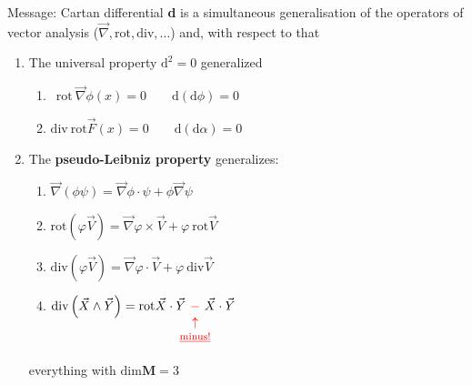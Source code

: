 \documentclass[../main.tex]{subfiles}
\begin{document}
{\selectfont{}\relax} Message: Cartan differential \textbf{d} is a simultaneous generalisation of the operators of vector analysis ($\vec{\nabla}, \textrm{rot}, \textrm{div}, \dots$) and, with respect to that
\begin{enumerate}
    \item The universal property $\textrm{d}^2=0$ generalized
    \begin{enumerate}
        \item \(\ \ \textrm{rot}\ \vec{\nabla}\phi(x)=0 \qquad \textrm{d}\left(\textrm{d}\phi\right)=0\)
        \item \(\textrm{div}\ \textrm{rot}\vec{F}(x)=0 \qquad \textrm{d}\left(\textrm{d}\alpha\right)=0\)
    \end{enumerate}
    \item The \textbf{pseudo-Leibniz property} generalizes:
    \begin{enumerate}
        \item $\vec{\nabla}\left(\phi\psi\right)=\vec{\nabla}\phi\cdot\psi+\phi\vec{\nabla}\psi$
        \item \(\textrm{rot}\left(\varphi\vec{V}\right)=\vec{\nabla}\varphi\times\vec{V}+\varphi \ \textrm{rot}\vec{V}\)
        \item \(\textrm{div}\left(\varphi\vec{V}\right)=\vec{\nabla}\varphi\cdot\vec{V}+\varphi \ \textrm{div}\vec{V}\)
        \item \(\textrm{div}\left(\vec{X}\wedge\vec{Y}\right)=\textrm{rot}\vec{X}\cdot\vec{Y}\ {\color{red}\underset{\mathclap{\tikz \node {\color{red}$\uparrow$} node [below=1ex] {\footnotesize \color{red} \underline{minus!} };}}{-}}\ \vec{X}\cdot\vec{Y}\)
    \end{enumerate}
    everything with $\textrm{dim}\mathbf{M}=3$
\end{enumerate}
\end{document}
